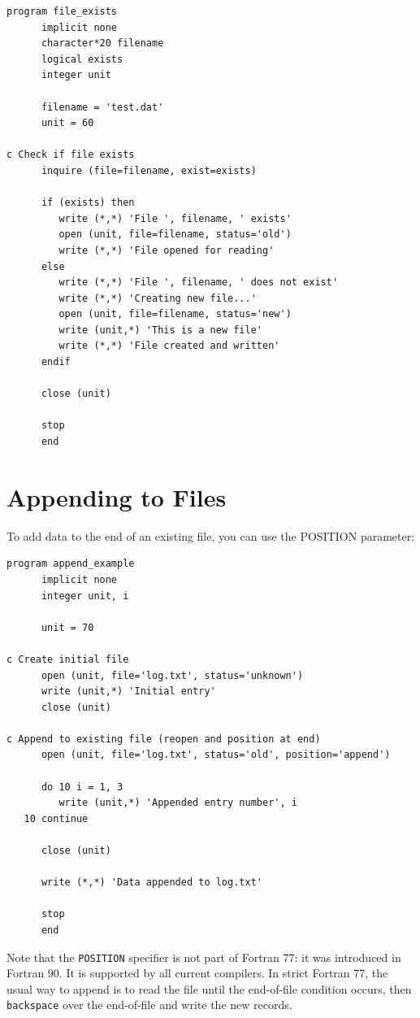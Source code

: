 \begin{lstlisting}[style=fortran77]
      program file_exists
      implicit none
      character*20 filename
      logical exists
      integer unit
      
      filename = 'test.dat'
      unit = 60
      
c Check if file exists
      inquire (file=filename, exist=exists)
      
      if (exists) then
         write (*,*) 'File ', filename, ' exists'
         open (unit, file=filename, status='old')
         write (*,*) 'File opened for reading'
      else
         write (*,*) 'File ', filename, ' does not exist'
         write (*,*) 'Creating new file...'
         open (unit, file=filename, status='new')
         write (unit,*) 'This is a new file'
         write (*,*) 'File created and written'
      endif
      
      close (unit)
      
      stop
      end
\end{lstlisting}

\section{Appending to Files}

To add data to the end of an existing file, you can use the POSITION parameter:

\begin{lstlisting}[style=fortran77]
      program append_example
      implicit none
      integer unit, i
      
      unit = 70
      
c Create initial file
      open (unit, file='log.txt', status='unknown')
      write (unit,*) 'Initial entry'
      close (unit)
      
c Append to existing file (reopen and position at end)
      open (unit, file='log.txt', status='old', position='append')
      
      do 10 i = 1, 3
         write (unit,*) 'Appended entry number', i
   10 continue
      
      close (unit)
      
      write (*,*) 'Data appended to log.txt'

      stop
      end
\end{lstlisting}

Note that the \texttt{POSITION} specifier is not part of Fortran 77: it was introduced in Fortran 90. It is supported by all current compilers. In strict Fortran 77, the usual way to append is to read the file until the end-of-file condition occurs, then \texttt{backspace} over the end-of-file and write the new records.

